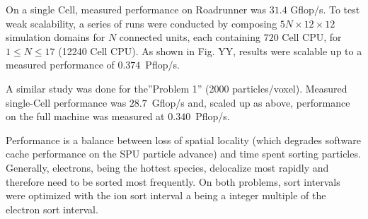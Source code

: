 \documentclass[journal,twoside]{IEEEtran}
\begin{document}
On a single Cell, measured performance on Roadrunner was $31.4$
Gflop/s.  To test weak scalability, a series of runs were conducted by
composing $5N \times 12 \times 12$ simulation domains for $N$
connected units, each containing $720$ Cell CPU, for $1 \le N \le 17$
(12240 Cell CPU).  As shown in Fig. YY, results were scalable up to a
measured performance of $0.374$~Pflop/s.

A similar study was done for the''Problem 1'' (2000 particles/voxel).
Measured single-Cell performance was $28.7$~Gflop/s and, scaled up as
above, performance on the full machine was measured at
$0.340$~Pflop/s.

Performance is a balance between loss of spatial locality (which
degrades software cache performance on the SPU particle advance) and
time spent sorting particles.  Generally, electrons, being the hottest
species, delocalize most rapidly and therefore need to be sorted most
frequently.  On both problems, sort intervals were optimized with the
ion sort interval a being a integer multiple of the electron sort
interval.







\end{document}
